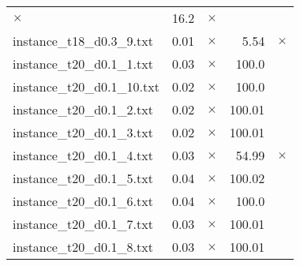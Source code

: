 \documentclass{article}
\begin{document}
\begin{center}
\begin{tabular}{lrrrr}
$\times$
 & 16.2 & 
$\times$
\\
instance\_t18\_d0.3\_9.txt & 0.01 & 
$\times$
 & 5.54 & 
$\times$
\\
instance\_t20\_d0.1\_1.txt & 0.03 & 
$\times$
 & 100.0 & 
\\
instance\_t20\_d0.1\_10.txt & 0.02 & 
$\times$
 & 100.0 & 
\\
instance\_t20\_d0.1\_2.txt & 0.02 & 
$\times$
 & 100.01 & 
\\
instance\_t20\_d0.1\_3.txt & 0.02 & 
$\times$
 & 100.01 & 
\\
instance\_t20\_d0.1\_4.txt & 0.03 & 
$\times$
 & 54.99 & 
$\times$
\\
instance\_t20\_d0.1\_5.txt & 0.04 & 
$\times$
 & 100.02 & 
\\
instance\_t20\_d0.1\_6.txt & 0.04 & 
$\times$
 & 100.0 & 
\\
instance\_t20\_d0.1\_7.txt & 0.03 & 
$\times$
 & 100.01 & 
\\
instance\_t20\_d0.1\_8.txt & 0.03 & 
$\times$
 & 100.01 & 
\\
\hline\end{tabular}
\end{center}
\end{document}

